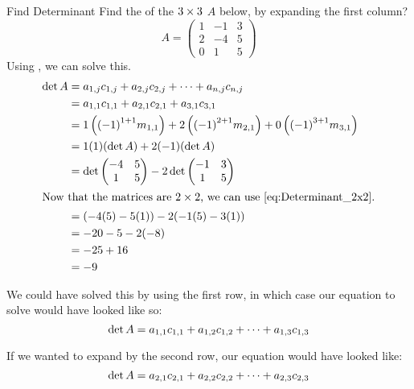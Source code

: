 \begin{example}{Find Determinant}
  Find the  of the $3 \times 3$  $A$ below, by expanding the first column?
  \begin{equation*}
    A =
    \begin{pmatrix}
      1 & -1 & 3 \\
      2 & -4 & 5 \\
      0 & 1 & 5
    \end{pmatrix}
  \end{equation*}
  \tcblower{}
  Using , we can solve this.
  \begin{align*}
    \det A &= a_{1,j} \Cofactor{1}{j} + a_{2,j} \Cofactor{2}{j} + \cdots + a_{n,j} \Cofactor{n}{j} \\
           &= a_{1,1} \Cofactor{1}{1} + a_{2,1} \Cofactor{2}{1} + a_{3,1} \Cofactor{3}{1} \\
           &= 1 \left( {(-1)}^{1+1} \Minor{1}{1} \right) + 2 \left( {(-1)}^{2+1} \Minor{2}{1} \right) + 0 \left( {(-1)}^{3+1} \Minor{3}{1} \right) \\
           &= 1 (1) (\det A) + 2 (-1) (\det A) \\
    &= \det
      \begin{pmatrix}
        -4 & 5 \\
        1 & 5
      \end{pmatrix}
            -2 \det
            \begin{pmatrix}
              -1 & 3 \\
              1 & 5
            \end{pmatrix} \\
    \intertext{Now that the matrices are $2 \by 2$, we can use \Cref{eq:Determinant_2x2}.}
           &= (-4(5) - 5(1)) - 2(-1(5) - 3(1)) \\
           &= -20 - 5 - 2(-8) \\
           &= -25 + 16 \\
           &= -9
  \end{align*}

  We could have solved this by using the first row, in which case our equation to solve would have looked like so:
  \begin{equation*}
    \det A = a_{1,1} c_{1,1} + a_{1,2} c_{1,2} + \cdots + a_{1,3} c_{1,3}
  \end{equation*}

  If we wanted to expand by the second row, our equation would have looked like:
  \begin{equation*}
    \det A = a_{2,1} c_{2,1} + a_{2,2} c_{2,2} + \cdots + a_{2,3} c_{2,3}
  \end{equation*}
\end{example}


